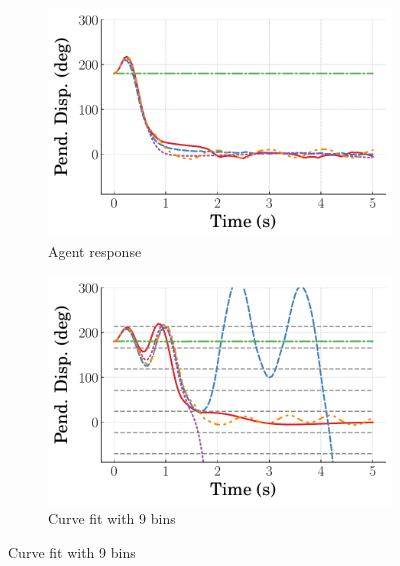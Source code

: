 \begin{figure}
    \centering
    \begin{subfigure}[b]{0.32\textwidth}
        \centering
        \includegraphics[width=\textwidth]{figures/figures_Interpretability/Mean_ISE_Inverted_Pendulum-v0_cubic_9_bins/Curve_fit_time_responses/pure_RL/agent_Pend_Disp_180.pdf}
        \caption{Agent response}
        \label{subfig_chap5:inv_pend_pure_RL_180_init_agent_unclipped}
    \end{subfigure}
    \hfill
    \begin{subfigure}[b]{0.32\textwidth}
        \centering
        \includegraphics[width=\textwidth]{figures/figures_Interpretability/Mean_ISE_Inverted_Pendulum-v0_cubic_9_bins/Curve_fit_time_responses/pure_RL/curve_fit_Pend_Disp_180.pdf}
        \caption{Curve fit with 9 bins}
        \label{subfig_chap5:inv_pend_pure_RL_180_init_curve_fit_9_bins_unclipped}

\end{subfigure}
\end{figure}
